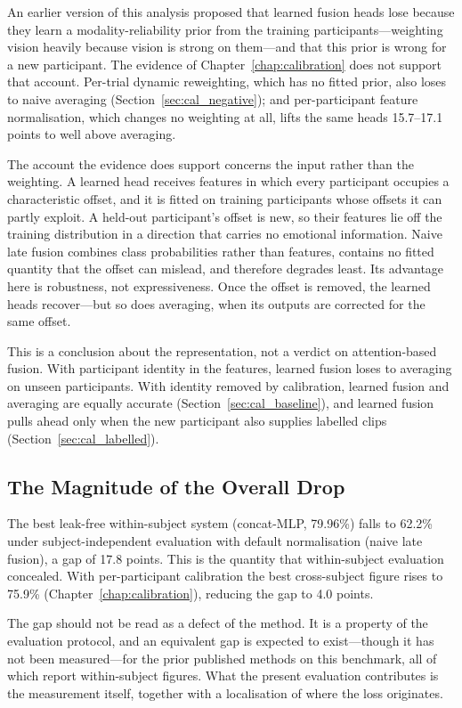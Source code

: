 An earlier version of this analysis proposed that learned fusion heads lose because
they learn a modality-reliability prior from the training participants---weighting
vision heavily because vision is strong on them---and that this prior is wrong for a
new participant. The evidence of Chapter~\ref{chap:calibration} does not support that
account. Per-trial dynamic reweighting, which has no fitted prior, also loses to naive
averaging (Section~\ref{sec:cal_negative}); and per-participant feature normalisation,
which changes no weighting at all, lifts the same heads 15.7--17.1 points to well above
averaging.

The account the evidence does support concerns the input rather than the weighting. A
learned head receives features in which every participant occupies a characteristic
offset, and it is fitted on training participants whose offsets it can partly exploit.
A held-out participant's offset is new, so their features lie off the training
distribution in a direction that carries no emotional information. Naive late fusion
combines class probabilities rather than features, contains no fitted quantity that
the offset can mislead, and therefore degrades least. Its advantage here is robustness,
not expressiveness. Once the offset is removed, the learned heads recover---but so does
averaging, when its outputs are corrected for the same offset.

This is a conclusion about the representation, not a verdict on attention-based fusion.
With participant identity in the features, learned fusion loses to averaging on unseen
participants. With identity removed by calibration, learned fusion and averaging are
equally accurate (Section~\ref{sec:cal_baseline}), and learned fusion pulls ahead only
when the new participant also supplies labelled clips (Section~\ref{sec:cal_labelled}).

\subsection{The Magnitude of the Overall Drop}

The best leak-free within-subject system (concat-MLP, 79.96\%) falls to 62.2\% under
subject-independent evaluation with default normalisation (naive late fusion), a gap
of 17.8 points. This is the quantity that within-subject evaluation concealed. With
per-participant calibration the best cross-subject figure rises to 75.9\%
(Chapter~\ref{chap:calibration}), reducing the gap to 4.0 points.

The gap should not be read as a defect of the method. It is a property of the
evaluation protocol, and an equivalent gap is expected to exist---though it has not
been measured---for the prior published methods on this benchmark, all of which report
within-subject figures. What the present evaluation contributes is the measurement
itself, together with a localisation of where the loss originates.

